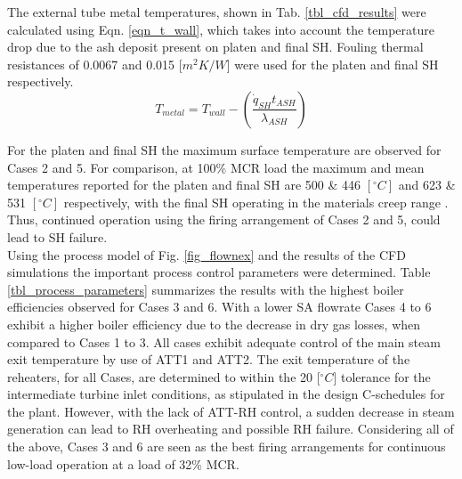 \documentclass[twocolumn,10pt]{asme2ej}
\begin{document}
The external tube metal temperatures, shown in Tab. \ref{tbl_cfd_results} were calculated using Eqn. \ref{eqn_t_wall}, which takes into account the temperature drop due to the ash deposit present on platen and final SH. Fouling thermal resistances of 0.0067 and 0.015 [$m^2K/W$] were used for the platen and final SH respectively.
\begin{equation}\label{eqn_t_wall}
T_{metal} = T_{wall} - \left(\frac{\dot{q}_{SH}t_{ASH}}{\lambda_{ASH}}\right)
\end{equation}

For the platen and final SH the maximum surface temperature are observed for Cases 2 and 5. For comparison, at 100\% MCR load the maximum and mean temperatures reported for the platen and final SH are 500 \& 446 $[^\circ C]$ and 623 \& 531 $[^\circ C]$ respectively, with the final SH operating in the materials creep range \cite{Laubscher2019b}. Thus, continued operation using the firing arrangement of Cases 2 and 5, could lead to SH failure.\\
\newpage
Using the process model of Fig. \ref{fig_flownex} and the results of the CFD simulations the important process control parameters were determined. Table \ref{tbl_process_parameters} summarizes the results with the highest boiler efficiencies observed for Cases 3 and 6. With a lower SA flowrate Cases 4 to 6 exhibit a higher boiler efficiency due to the decrease in dry gas losses, when compared to Cases 1 to 3. All cases exhibit adequate control of the main steam exit temperature by use of ATT1 and ATT2. The exit temperature of the reheaters, for all Cases, are determined to within the 20 [$^\circ C$] tolerance for the intermediate turbine inlet conditions, as stipulated in the design C-schedules for the plant. However, with the lack of ATT-RH control, a sudden decrease in steam generation can lead to RH overheating and possible RH failure. Considering all of the above, Cases 3 and 6 are seen as the best firing arrangements for continuous low-load operation at a load of 32\% MCR.\\
\end{document}
